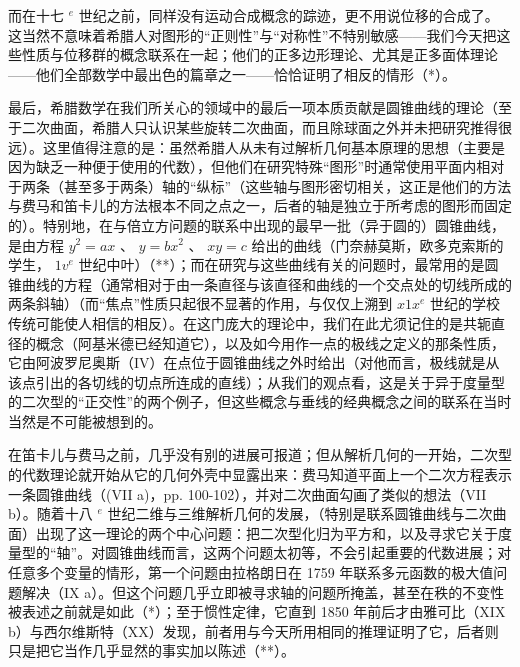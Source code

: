 而在十七 \(^{e}\) 世纪之前，同样没有运动合成概念的踪迹，更不用说位移的合成了。这当然不意味着希腊人对图形的“正则性”与“对称性”不特别敏感——我们今天把这些性质与位移群的概念联系在一起；他们的正多边形理论、尤其是正多面体理论——他们全部数学中最出色的篇章之一——恰恰证明了相反的情形（*）。

最后，希腊数学在我们所关心的领域中的最后一项本质贡献是圆锥曲线的理论（至于二次曲面，希腊人只认识某些旋转二次曲面，而且除球面之外并未把研究推得很远）。这里值得注意的是：虽然希腊人从未有过解析几何基本原理的思想（主要是因为缺乏一种便于使用的代数），但他们在研究特殊“图形”时通常使用平面内相对于两条（甚至多于两条）轴的“纵标”（这些轴与图形密切相关，这正是他们的方法与费马和笛卡儿的方法根本不同之点之一，后者的轴是独立于所考虑的图形而固定的）。特别地，在与倍立方问题的联系中出现的最早一批（异于圆的）圆锥曲线，是由方程 \(y^{2} = ax\) 、 \(y = bx^{2}\) 、 \(xy = c\) 给出的曲线（门奈赫莫斯，欧多克索斯的学生， \(1v^{e}\) 世纪中叶）（**）；而在研究与这些曲线有关的问题时，最常用的是圆锥曲线的方程（通常相对于由一条直径与该直径和曲线的一个交点处的切线所成的两条斜轴）（而“焦点”性质只起很不显著的作用，与仅仅上溯到 \(x1x^{e}\) 世纪的学校传统可能使人相信的相反）。在这门庞大的理论中，我们在此尤须记住的是共轭直径的概念（阿基米德已经知道它），以及如今用作一点的极线之定义的那条性质，它由阿波罗尼奥斯（IV）在点位于圆锥曲线之外时给出（对他而言，极线就是从该点引出的各切线的切点所连成的直线）；从我们的观点看，这是关于异于度量型的二次型的“正交性”的两个例子，但这些概念与垂线的经典概念之间的联系在当时当然是不可能被想到的。

在笛卡儿与费马之前，几乎没有别的进展可报道；但从解析几何的一开始，二次型的代数理论就开始从它的几何外壳中显露出来：费马知道平面上一个二次方程表示一条圆锥曲线（(VII a)，pp. 100-102），并对二次曲面勾画了类似的想法（VII b）。随着十八 \(^{e}\) 世纪二维与三维解析几何的发展，（特别是联系圆锥曲线与二次曲面）出现了这一理论的两个中心问题：把二次型化归为平方和，以及寻求它关于度量型的“轴”。对圆锥曲线而言，这两个问题太初等，不会引起重要的代数进展；对任意多个变量的情形，第一个问题由拉格朗日在 1759 年联系多元函数的极大值问题解决（IX a）。但这个问题几乎立即被寻求轴的问题所掩盖，甚至在秩的不变性被表述之前就是如此（*）；至于惯性定律，它直到 1850 年前后才由雅可比（XIX b）与西尔维斯特（XX）发现，前者用与今天所用相同的推理证明了它，后者则只是把它当作几乎显然的事实加以陈述（**）。

